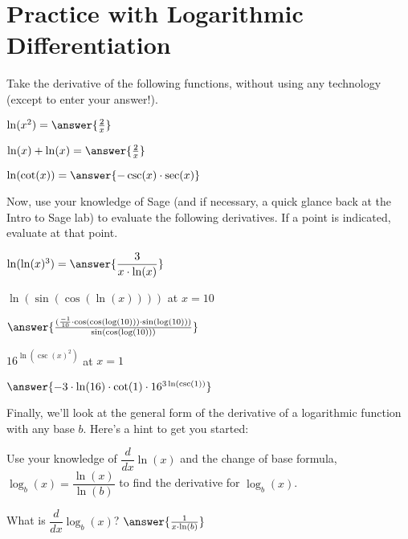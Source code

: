 \documentclass{ximera}
\begin{document}
\section{Practice with Logarithmic Differentiation}
Take the derivative of the following functions, without using any technology (except to enter your answer!).

\begin{problem}
$\ln(x^2)=\answer{\frac{2}{x}}$
\end{problem}

\begin{problem}
$\ln(x)+\ln(x)=\answer{\frac{2}{x}}$
\end{problem}

\begin{problem}
$\ln(\cot(x))=\answer{-\csc(x)\cdot\sec(x)}$
\end{problem}

Now, use your knowledge of Sage (and if necessary, a quick glance back at the Intro to Sage lab) to evaluate the following derivatives. If a point is indicated, evaluate at that point.



\begin{problem}
$\ln(\ln(x)^3)=\answer{\dfrac{3}{x\cdot \ln(x)}}$
\end{problem}

\begin{onlineOnly}
\begin{sageCell}

\end{sageCell}
\end{onlineOnly}

\begin{problem}

$\ln(\sin(\cos(\ln(x))))$ at $x=10$

$\answer{\frac{(\frac{-1}{10}\cdot\cos(\cos(\log(10)))\cdot\sin(\log(10)))}{\sin(\cos(\log(10)))}}$
\end{problem}

\begin{problem}
$16^{\ln(\csc(x)^2)}$ at $x = 1$

$\answer{-3\cdot\ln(16)\cdot\cot(1)\cdot 16^{3\ln(\csc(1))}}$
\end{problem}

Finally, we'll look at the general form of the derivative of a logarithmic function with any base $b$. Here's a hint to get you started:

Use your knowledge of $\dfrac{d}{dx} \ln(x)$ and the change of base formula, $\log_b(x) = \dfrac{\ln(x)}{\ln(b)}$ to find the derivative for $\log_b(x)$.
\begin{problem}
What is $\dfrac{d}{dx}\log_b(x)$?
$\answer{\frac{1}{x\cdot\ln(b)}}$
\end{problem}
\end{document}
